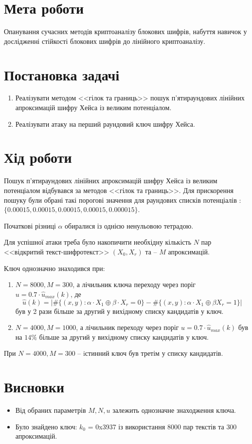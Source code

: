 \documentclass[12pt,a4paper]{article}
\begin{document}
\section{Мета роботи}

Опанування сучасних методів криптоаналізу блокових шифрів, набуття навичок у
дослідженні стійкості блокових шифрів до лінійного криптоаналізу.

\section{Постановка задачі}

\begin{enumerate}

\item Реалізувати методом <<гілок та границь>> пошук п’ятираундових лінійних
апроксимацій шифру Хейса із великим потенціалом. 

\item Реалізувати атаку на перший раундовий ключ шифру Хейса. 

\end{enumerate}


\section{Хід роботи}

Пошук п’ятираундових лінійних апроксимацій шифру Хейса із великим потенціалом відбувався за методов <<гілок та границь>>. 
Для прискорення пошуку були обрані такі порогові значення для раундових списків потенціалів : $\{ 0.00015, 0.00015, 0.00015, 0.00015, 0.000015 \}$.\par
Початкові різниці $\alpha$ обиралися із однією ненульовою тетрадою.\par
Для успішної атаки треба було накопичити необхідну кількість $N$ пар <<відкритий текст-шифротекст>> $(X_0,X_{r})$ та -- $M$ апроксимацій. \par
Ключ однозначно знаходився при:
\begin{enumerate}

\item $N=8000, M=300$, а лічильник ключа
переходу через поріг $u = 0.7 \cdot \hat{u}_{max}(k)$, де
\[
\hat{u}(k) = | \# \{(x,y): \alpha \cdot X_1 \oplus \beta \cdot X_{r} =0 \} - \# \{(x,y): \alpha \cdot X_1 \oplus \beta X_{r} = 1 \} | 
\]
 був у 2 рази більше за другий у вихідному списку кандидатів у ключ. 

\item $N=4000, M=1000$, а лічильник переходу через поріг $u = 0.7 \cdot \hat{u}_{max}(k)$ був на $14\%$ більше за другий у вихідному списку кандидатів у ключ. 

\end{enumerate}

При $N=4000, M=300$ -- iстинний ключ був третім у списку кандидатів.


\section{Висновки}

\begin{itemize}

\item Від обраних параметрів $M,N,u$ залежить однозначне знаходження ключа.
\item Було знайдено ключ: $k_0$ = 0x3937 із використання $8000$ пар текстів та $300$ апроксимацій. 

\end{itemize}
\end{document}
